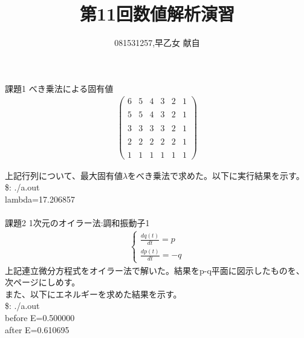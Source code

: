 \documentclass[]{jsarticle}
\title{第11回数値解析演習}
\author{081531257,早乙女 献自}
\date{}
\begin{document}
\maketitle
課題1 べき乗法による固有値\\
\begin{eqnarray}
\left(
\begin{array}{rrrrrr}
  6&5&4&3&2&1\\
  　&　&　& & &\\
  5&5&4&3&2&1\\
  　&　&　& & &\\
  3&3&3&3&2&1\\
  　&　&　& & &\\
  2&2&2&2&2&1\\
  　&　&　& & &\\
  1&1&1&1&1&1
\end{array}
\right)
\end{eqnarray}

上記行列について、最大固有値$\lambda$をべき乗法で求めた。以下に実行結果を示す。\\
\$: ./a.out\\
lambda=17.206857\\
\\
課題2 1次元のオイラー法:調和振動子1\\
\begin{eqnarray}
\left\{
\begin{array}{l}
\frac{dq(t)}{dt} = p\\
\frac{dp(t)}{dt} = -q
\end{array}
\right.
\end{eqnarray}
上記連立微分方程式をオイラー法で解いた。結果をp-q平面に図示したものを、次ページにしめす。\\
また、以下にエネルギーを求めた結果を示す。\\
\$: ./a.out\\
before E=0.500000\\
after E=0.610695
\end{document}
